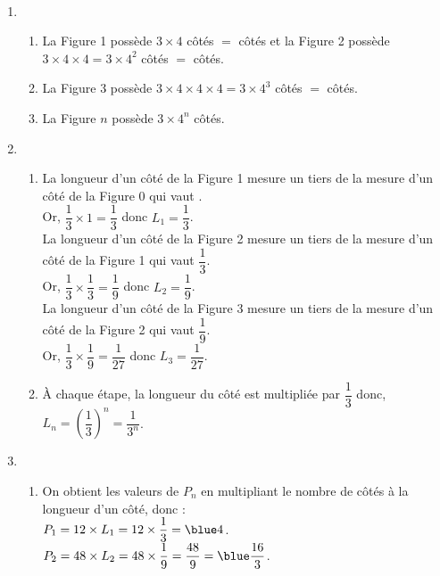 \ \\ [-5mm]
   \begin{enumerate}
      \item
         \begin{enumerate}
            \item La Figure 1 possède $3\times4$ côtés $=$ { côtés} et la Figure 2 possède $3\times4\times4 =3\times4^2$ côtés $=$ { côtés}.
            \item La Figure 3 possède $3\times4\times4\times4 =3\times4^3$ côtés $=$ { côtés}.
            \item La Figure $n$ possède {\blue $3\times4^n$ côtés}.
         \end{enumerate}
      \setcounter{enumi}{1}
      \item
         \begin{enumerate}
            \item La longueur d'un côté de la Figure 1 mesure un tiers de la mesure d'un côté de la Figure 0 qui vaut . \\ [1mm]
               Or, $\dfrac13\times1 =\dfrac13$ donc {\blue $L_1 =\dfrac13$}. \\
               La longueur d'un côté de la Figure 2 mesure un tiers de la mesure d'un côté de la Figure 1 qui vaut $\dfrac13$. \\
               Or, $\dfrac13\times\dfrac13 =\dfrac19$  donc {\blue $L_2 =\dfrac19$}. \\
               La longueur d'un côté de la Figure 3 mesure un tiers de la mesure d'un côté de la Figure 2 qui vaut $\dfrac19$. \\
               Or, $\dfrac13\times\dfrac19 =\dfrac{1}{27}$ donc {\blue $L_3 =\dfrac{1}{27}$}. \\ [1mm]
            \item À chaque étape, la longueur du côté est multipliée par $\dfrac13$ donc, {\blue $L_n =\left(\dfrac13\right)^n =\dfrac{1}{3^n}$}. \smallskip
         \end{enumerate}
      \setcounter{enumi}{2}
      \item
         \begin{enumerate}
            \item On obtient les valeurs de $P_n$ en multipliant le nombre de côtés à la longueur d'un côté, donc : \\
               $P_1 =12\times L_1 =12\times\dfrac13 ={\blue 4}$. \\ [1mm]
               $P_2 =48\times L_2 =48\times\dfrac19 =\dfrac{48}{9} ={\blue \dfrac{16}{3}}$. \\ [1mm]

\end{enumerate}
\end{enumerate}
